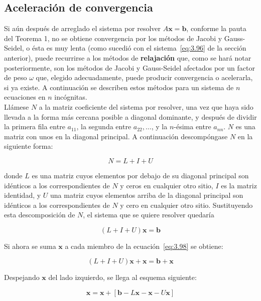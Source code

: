 \documentclass[12pt,letterpaper]{article}
\theoremstyle{definition}
\theoremstyle{plain}
\theoremstyle{remark}
\begin{document}
\subsection{Aceleración de convergencia}

Si aún después de arreglado el sistema por resolver $A \mathbf{x} = \mathbf{b}$, conforme la pauta del Teorema 1, no se obtiene convergencia por los métodos de Jacobi y Gauss-Seidel, o ésta es muy lenta (como sucedió con el sistema~\eqref{eq:3.96} de la sección anterior), puede recurrirse a los métodos de \textbf{relajación} que, como se hará notar posteriormente, son los métodos de Jacobi y Gauss-Seidel afectados por un factor de peso $\omega$ que, elegido adecuadamente, puede producir convergencia o acelerarla, si ya existe. A continuación se describen estos métodos para un sistema de $n$ ecuaciones en $n$ incógnitas.\\

Llámese $N$ a la matriz coeficiente del sistema por resolver, una vez que haya sido llevada a la forma más cercana posible a diagonal dominante, y después de dividir la primera fila entre $a_{11}$, la segunda entre $a_{22}, \ldots$, y la $n$-ésima entre $a_{nn}$. $N$ es una matriz con unos en la diagonal principal. A continuación descompóngase $N$ en la siguiente forma:

\begin{equation}
N = L + I + U
\end{equation}

donde $L$ es una matriz cuyos elementos por debajo de su diagonal principal son idénticos a los correspondientes de $N$ y ceros en cualquier otro sitio, $I$ es la matriz identidad, y $U$ una matriz cuyos elementos arriba de la diagonal principal son idénticos a los correspondientes de $N$ y cero en cualquier otro sitio. Sustituyendo esta descomposición de $N$, el sistema que se quiere resolver quedaría

\begin{equation}
(L + I + U)\mathbf{x} = \mathbf{b}
\label{eq:3.98}
\tag{18}
\end{equation}

Si ahora se suma $\mathbf{x}$ a cada miembro de la ecuación~\eqref{eq:3.98} se obtiene:

\[
(L + I + U)\mathbf{x} + \mathbf{x} = \mathbf{b} + \mathbf{x}
\]

Despejando $\mathbf{x}$ del lado izquierdo, se llega al esquema siguiente:

\begin{equation}
\mathbf{x} = \mathbf{x} + \left[\mathbf{b} - L \mathbf{x} - \mathbf{x} - U \mathbf{x} \right]
\label{eq:3.99}
\tag{19}
\end{equation}
\end{document}
